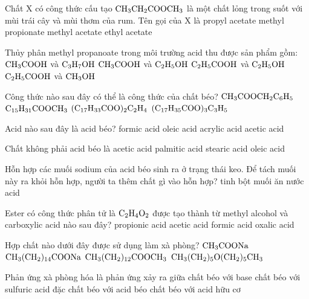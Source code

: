 \documentclass[12pt,a4paper]{article}
\begin{document}
\begin{ex}
Chất X có công thức cấu tạo $\ce{CH3CH2COOCH3}$ là một chất lỏng trong suốt với mùi trái cây và mùi thơm của rum. Tên gọi của X là
\choice
{propyl acetate}
{methyl propionate}
{methyl acetate}
{ethyl acetate}
\loigiai{}
\end{ex}

\begin{ex}
Thủy phân methyl propanoate trong môi trường acid thu được sản phẩm gồm:
\choice
{$\ce{CH3COOH}$ và $\ce{C3H7OH}$}
{$\ce{CH3COOH}$ và $\ce{C2H5OH}$}
{$\ce{C2H5COOH}$ và $\ce{C2H5OH}$}
{$\ce{C2H5COOH}$ và $\ce{CH3OH}$}
\loigiai{}
\end{ex}

\begin{ex}
Công thức nào sau đây có thể là công thức của chất béo?
\choice
{$\ce{CH3COOCH2C6H5}$}
{$\ce{C15H31COOCH3}$}
{$\ce{(C17H33COO)2C2H4}$}
{$\ce{(C17H35COO)3C3H5}$}
\loigiai{}
\end{ex}

\begin{ex}
Acid nào sau đây là acid béo?
\choice
{formic acid}
{oleic acid}
{acrylic acid}
{acetic acid}
\loigiai{}
\end{ex}

\begin{ex}
Chất không phải acid béo là
\choice
{acetic acid}
{palmitic acid}
{stearic acid}
{oleic acid}
\loigiai{}
\end{ex}

\begin{ex}
Hỗn hợp các muối sodium của acid béo sinh ra ở trạng thái keo. Để tách muối này ra khỏi hỗn hợp, người ta thêm chất gì vào hỗn hợp?
\choice
{tinh bột}
{muối ăn}
{nước}
{acid}
\loigiai{}
\end{ex}

\begin{ex}
Ester có công thức phân tử là $\ce{C2H4O2}$ được tạo thành từ methyl alcohol và carboxylic acid nào sau đây?
\choice
{propionic acid}
{acetic acid}
{formic acid}
{oxalic acid}
\loigiai{}
\end{ex}

\begin{ex}
Hợp chất nào dưới đây được sử dụng làm xà phòng?
\choice
{$\ce{CH3COONa}$}
{$\ce{CH3(CH2)14COONa}$}
{$\ce{CH3(CH2)12COOCH3}$}
{$\ce{CH3(CH2)5O(CH2)5CH3}$}
\loigiai{}
\end{ex}

\begin{ex}
Phản ứng xà phòng hóa là phản ứng xảy ra giữa
\choice
{chất béo với base}
{chất béo với sulfuric acid đặc}
{chất béo với acid béo}
{chất béo với acid hữu cơ}
\loigiai{}
\end{ex}
\end{document}
